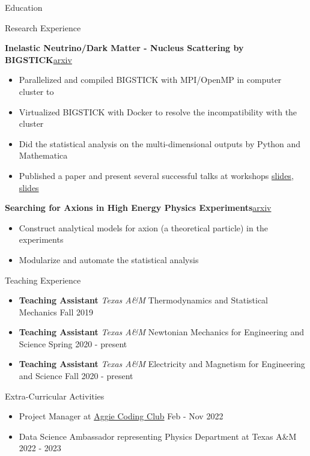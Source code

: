 \documentclass{resume}
\begin{document}
\begin{rSection}{Education}
\begin{rSection}{Research Experience}
\vspace{-1.25em}
\item \textbf{Inelastic Neutrino/Dark Matter - Nucleus Scattering by BIGSTICK}\hfill \href{https://arxiv.org/pdf/2206.08590.pdf}{arxiv}
    \begin{itemize}
    \itemsep -3pt {}
    \item Parallelized and compiled BIGSTICK with MPI/OpenMP in computer cluster to
    \item Virtualized BIGSTICK with Docker to resolve the incompatibility with the cluster
    \item Did the statistical analysis on the multi-dimensional outputs by Python and Mathematica
    \item Published a paper and present several successful talks at workshops \href{https://noctildon.github.io/physics/Phenon_2022.pdf}{slides}, \href{https://noctildon.github.io/physics/Plains_2022.pdf}{slides}
    \end{itemize}
\item \textbf{Searching for Axions in High Energy Physics Experiments}\hfill \href{https://arxiv.org/pdf/2207.13659.pdf}{arxiv}
    \begin{itemize}
    \itemsep -3pt {}
    \item Construct analytical models for axion (a theoretical particle) in the experiments
    \item Modularize and automate the statistical analysis
    \end{itemize}
\end{rSection}


\begin{rSection}{Teaching Experience}
    \begin{itemize}
        \item \textbf{Teaching Assistant} {{\it Texas A\&M} Thermodynamics and Statistical Mechanics} \hfill Fall 2019
        \item \textbf{Teaching Assistant} {{\it Texas A\&M} Newtonian Mechanics for Engineering and Science} \hfill Spring 2020 - present
        \item \textbf{Teaching Assistant} {{\it Texas A\&M} Electricity and Magnetism for Engineering and Science} \hfill Fall 2020 - present
    \end{itemize}
\end{rSection}


\begin{rSection}{Extra-Curricular Activities}
\begin{itemize}
    \item Project Manager at \href{https://aggiecodingclub.com/}{Aggie Coding Club} \hfill Feb - Nov 2022
    \item Data Science Ambassador representing Physics Department at Texas A\&M \hfill 2022 - 2023
\end{itemize}
\end{rSection}



\end{rSection}
\end{document}
